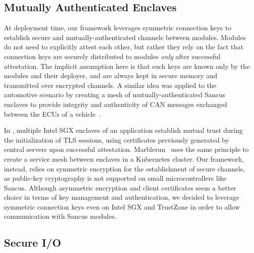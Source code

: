 \subsection{Mutually Authenticated Enclaves}
\label{sec:relwork:mutual}
%
At deployment time, our framework leverages symmetric connection keys to
establish secure and mutually-authenticated channels between modules. Modules do
not need to explicitly attest each other, but rather they rely on the fact that
connection keys are securely distributed to modules \textit{only} after
successful attestation. The implicit assumption here is that such keys are known
only by the modules and their deployer, and are always kept in secure memory and
transmitted over encrypted channels. A similar idea was applied to the
automotive scenario by creating a mesh of mutually-authenticated Sancus enclaves
to provide integrity and authenticity of CAN messages exchanged between the ECUs
of a vehicle~\cite{vanbulck_2017vulcan}.

In \cite{zheng2021secure}, multiple Intel \ac{SGX} enclaves of an application
establish mutual trust during the initialization of TLS sessions, using
certificates previously generated by central servers upon successful
attestation. Marblerun~\cite{marblerun} uses the same principle to create a
service mesh between enclaves in a Kubernetes cluster. Our framework, instead,
relies on symmetric encryption for the establishment of secure channels, as
public-key cryptography is not supported on small microcontrollers like Sancus.
Although asymmetric encryption and client certificates seem a better choice in
terms of key management and authentication, we decided to leverage symmetric
connection keys even on Intel \ac{SGX} and TrustZone in order to allow
communication with Sancus modules.

\subsection{Secure I/O}
\label{rel-work:secureio}

